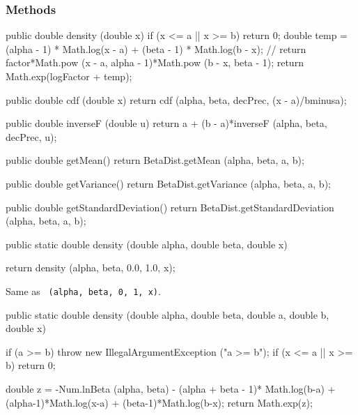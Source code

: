 \subsubsection* {Methods}

\begin{code}\begin{hide}

   public double density (double x) {
      if (x <= a || x >= b)
         return 0;
      double temp = (alpha - 1) * Math.log(x - a) + (beta - 1) * Math.log(b - x);
//      return factor*Math.pow (x - a, alpha - 1)*Math.pow (b - x, beta - 1);
      return Math.exp(logFactor + temp);
   }

   public double cdf (double x) {
      return cdf (alpha, beta, decPrec, (x - a)/bminusa);
   }

   public double inverseF (double u) {
      return a + (b - a)*inverseF (alpha, beta,  decPrec, u);
   }

   public double getMean() {
      return BetaDist.getMean (alpha, beta, a, b);
   }

   public double getVariance() {
      return BetaDist.getVariance (alpha, beta, a, b);
   }

   public double getStandardDeviation() {
      return BetaDist.getStandardDeviation (alpha, beta, a, b);
   }\end{hide}

   public static double density (double alpha, double beta, double x)\begin{hide} {
      return density (alpha, beta, 0.0, 1.0, x);
   }\end{hide}
\end{code}
\begin{tabb} Same as
 ~\texttt{(alpha, beta, 0, 1, x)}.
\end{tabb}
\begin{code}

   public static double density (double alpha, double beta,
                                 double a, double b, double x)\begin{hide} {
      if (a >= b)
         throw new IllegalArgumentException ("a >= b");
      if (x <= a || x >= b)
         return 0;

      double z = -Num.lnBeta (alpha, beta) - (alpha + beta - 1)* Math.log(b-a) +
		      (alpha-1)*Math.log(x-a) + (beta-1)*Math.log(b-x);
      return Math.exp(z);
   }\end{hide}
\end{code}
